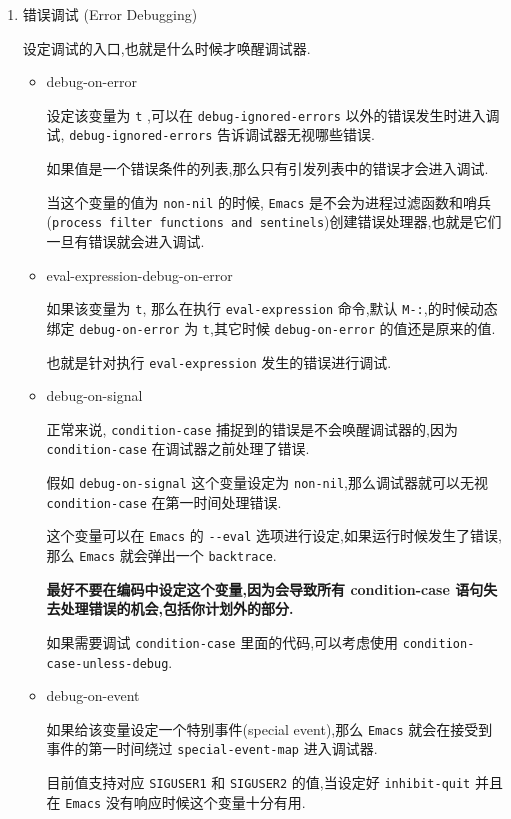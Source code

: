 \documentclass[11pt]{article}
\begin{document}
\begin{enumerate}
\item 错误调试 (Error Debugging)
\label{sec:org62e3dfb}

设定调试的入口,也就是什么时候才唤醒调试器.

\begin{itemize}
\item debug-on-error

设定该变量为 \texttt{t} ,可以在 \texttt{debug-ignored-errors} 以外的错误发生时进入调试, \texttt{debug-ignored-errors} 告诉调试器无视哪些错误.

如果值是一个错误条件的列表,那么只有引发列表中的错误才会进入调试.

当这个变量的值为 \texttt{non-nil} 的时候, \texttt{Emacs} 是不会为进程过滤函数和哨兵 (\texttt{process filter functions and sentinels})创建错误处理器,也就是它们一旦有错误就会进入调试.

\item eval-expression-debug-on-error

如果该变量为 \texttt{t}, 那么在执行 \texttt{eval-expression} 命令,默认 \texttt{M-:},的时候动态绑定 \texttt{debug-on-error} 为 \texttt{t},其它时候 \texttt{debug-on-error} 的值还是原来的值.

也就是针对执行 \texttt{eval-expression} 发生的错误进行调试.

\item debug-on-signal

正常来说, \texttt{condition-case} 捕捉到的错误是不会唤醒调试器的,因为 \texttt{condition-case} 在调试器之前处理了错误.

假如 \texttt{debug-on-signal} 这个变量设定为 \texttt{non-nil},那么调试器就可以无视 \texttt{condition-case} 在第一时间处理错误.

这个变量可以在 \texttt{Emacs} 的 \texttt{-{}-{}eval} 选项进行设定,如果运行时候发生了错误,那么 \texttt{Emacs} 就会弹出一个 \texttt{backtrace}.

\textbf{最好不要在编码中设定这个变量,因为会导致所有 condition-case 语句失去处理错误的机会,包括你计划外的部分.}

如果需要调试 \texttt{condition-case} 里面的代码,可以考虑使用 \texttt{condition-case-unless-debug}.

\item debug-on-event

如果给该变量设定一个特别事件(special event),那么 \texttt{Emacs} 就会在接受到事件的第一时间绕过 \texttt{special-event-map} 进入调试器.

目前值支持对应 \texttt{SIGUSER1} 和 \texttt{SIGUSER2} 的值,当设定好 \texttt{inhibit-quit} 并且在 \texttt{Emacs} 没有响应时候这个变量十分有用.


\end{itemize}
\end{enumerate}
\end{document}
